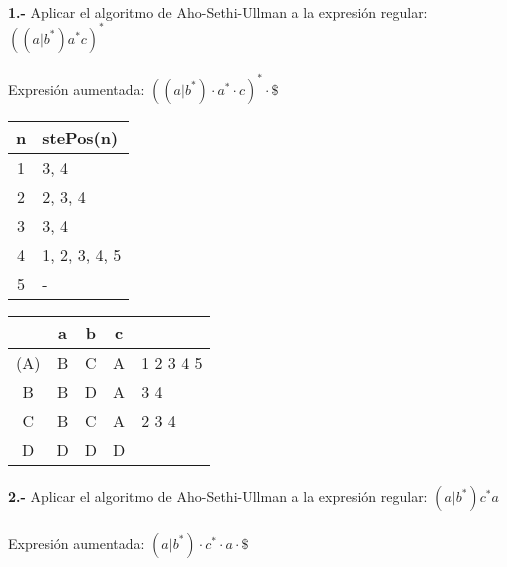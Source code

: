 \documentclass[11pt,a4paper]{report}
\begin{document}
\paragraph{}

\paragraph{}
\textbf{1.-} Aplicar el algoritmo de Aho-Sethi-Ullman a la expresión regular: \textbf{$ ((a|b^*)a^*c)^* $} \\
\\
Expresión aumentada: $ ((a|b^*)\cdot a^*\cdot c)^*\cdot \$  $ \\

\begin{tabular} {| c | l |}
\hline
n & stePos(n) \\ \hline
1 & 3, 4 \\ \hline
2 & 2, 3, 4 \\ \hline
3 & 3, 4 \\ \hline
4 & 1, 2, 3, 4, 5 \\ \hline
5 & - \\ \hline
\end{tabular}
\quad
\begin{tabular} {| c | c |c |c | l |}
\hline 
& a & b & c & \\ \hline
(A) & B & C & A & 1 2 3 4 5 \\ \hline
B & B & D & A & 3 4 \\ \hline
C & B & C & A & 2 3 4 \\ \hline
D & D & D & D & \\ \hline
\end{tabular}\paragraph{}
\textbf{2.-} Aplicar el algoritmo de Aho-Sethi-Ullman a la expresión regular: \textbf{$ (a|b^*)c^*a $} \\
\\
Expresión aumentada: $ (a|b^*)\cdot c^*\cdot a\cdot \$  $ \\
\end{document}
